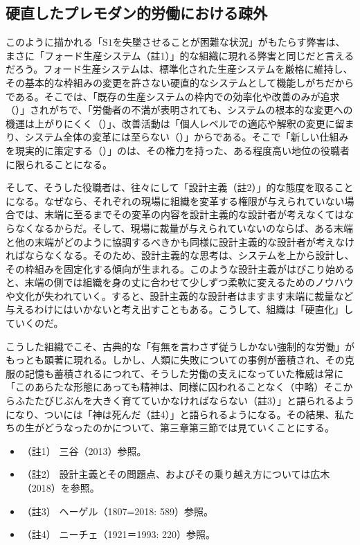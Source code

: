 \subsection{硬直したプレモダン的労働における疎外}\label{ux786cux76f4ux3057ux305fux30d7ux30ecux30e2ux30c0ux30f3ux7684ux52b4ux50cdux306bux304aux3051ux308bux758eux5916}

このように描かれる「\(\textrm{S}1\)を失墜させることが困難な状況」がもたらす弊害は、まさに「フォード生産システム（註1）」的な組織に現れる弊害と同じだと言えるだろう。フォード生産システムは、標準化された生産システムを厳格に維持し、その基本的な枠組みの変更を許さない硬直的なシステムとして機能しがちだからである。そこでは、「既存の生産システムの枠内での効率化や改善のみが追求（）」されがちで、「労働者の不満が表明されても、システムの根本的な変更への機運は上がりにくく（）」、改善活動は「個人レベルでの適応や解釈の変更に留まり、システム全体の変革には至らない（）」からである。そこで「新しい仕組みを現実的に策定する（）」のは、その権力を持った、ある程度高い地位の役職者に限られることになる。

そして、そうした役職者は、往々にして「設計主義（註2）」的な態度を取ることになる。なぜなら、それぞれの現場に組織を変革する権限が与えられていない場合では、末端に至るまでその変革の内容を設計主義的な設計者が考えなくてはならなくなるからだ。そして、現場に裁量が与えられていないのならば、ある末端と他の末端がどのように協調するべきかも同様に設計主義的な設計者が考えなければならなくなる。そのため、設計主義的な思考は、システムを上から設計し、その枠組みを固定化する傾向が生まれる。このような設計主義がはびこり始めると、末端の側では組織を身の丈に合わせて少しずつ柔軟に変えるためのノウハウや文化が失われていく。すると、設計主義的な設計者はますます末端に裁量など与えるわけにはいかないと考え出すこともある。こうして、組織は「硬直化」していくのだ。

こうした組織でこそ、古典的な「有無を言わさず従うしかない強制的な労働」がもっとも顕著に現れる。しかし、人類に失敗についての事例が蓄積され、その克服の記憶も蓄積されるにつれて、そうした労働の支えになっていた権威は常に「このあらたな形態にあっても精神は、同様に囚われることなく（中略）そこからふたたびじぶんを大きく育てていかなければならない（註3）」と語られるようになり、ついには「神は死んだ（註4）」と語られるようになる。その結果、私たちの生がどうなったのかについて、第三章第三節では見ていくことにする。

\begin{itemize}
\tightlist
\item
  （註1） 三谷（2013）\cite{Mitani}参照。
\item
  （註2）
  設計主義とその問題点、およびその乗り越え方については広木（2018）\cite{Hiroki}を参照。
\item
  （註3） ヘーゲル（1807=2018: 589）\cite{Hegel2}参照。
\item
  （註4） ニーチェ（1921＝1993: 220）\cite{Nietzsche3}参照。
\end{itemize}

